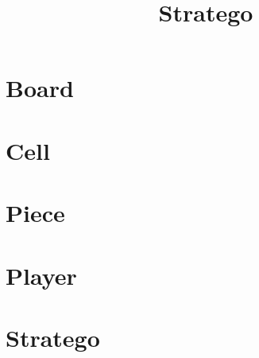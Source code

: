 \documentclass{article}
\begin{document}
\title{Stratego}
\author{}
\maketitle
\tableofcontents

\section{Board}

\section{Cell}

\section{Piece}

\section{Player}

\section{Stratego}

\end{document}
